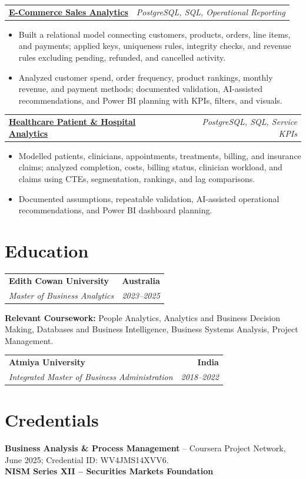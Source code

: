 \documentclass[letterpaper,10pt]{article}
\makeatletter
\newcommand{\role}[4]{%
  \begin{tabularx}{\textwidth}{@{}Xr@{}}
    \textbf{#1} & \textbf{#2} \\
    \textit{#3} & \textit{#4}
  \end{tabularx}\vspace{-1pt}
}
\newcommand{\project}[2]{%
  \begin{tabularx}{\textwidth}{@{}Xr@{}}
    \textbf{#1} & \textit{#2}
  \end{tabularx}\vspace{-1pt}
}
\makeatother
\begin{document}
\project{\href{https://github.com/jainalimehta/Ecommerce-Sales-Analytics}{E-Commerce Sales Analytics}}{PostgreSQL, SQL, Operational Reporting}
\begin{itemize}
  \item Built a relational model connecting customers, products, orders, line items, and payments; applied keys, uniqueness rules, integrity checks, and revenue rules excluding pending, refunded, and cancelled activity.
  \item Analyzed customer spend, order frequency, product rankings, monthly revenue, and payment methods; documented validation, AI-assisted recommendations, and Power BI planning with KPIs, filters, and visuals.
\end{itemize}
\vspace{1pt}

\project{\href{https://github.com/jainalimehta/Healthcare-Analytics}{Healthcare Patient \& Hospital Analytics}}{PostgreSQL, SQL, Service KPIs}
\begin{itemize}
  \item Modelled patients, clinicians, appointments, treatments, billing, and insurance claims; analyzed completion, costs, billing status, clinician workload, and claims using CTEs, segmentation, rankings, and lag comparisons.
  \item Documented assumptions, repeatable validation, AI-assisted operational recommendations, and Power BI dashboard planning.
\end{itemize}

\section{Education}
\role{Edith Cowan University}{Australia}{Master of Business Analytics}{2023--2025}
\small\textbf{Relevant Coursework:} People Analytics, Analytics and Business Decision Making, Databases and Business Intelligence, Business Systems Analysis, Project Management.\\[2pt]
\role{Atmiya University}{India}{Integrated Master of Business Administration}{2018--2022}

\section{Credentials}
\small\textbf{Business Analysis \& Process Management} -- Coursera Project Network, June 2025; Credential ID: WV4JMS14XVV6.\\[-0.2pt]
\small\textbf{NISM Series XII -- Securities Markets Foundation}
\end{document}
